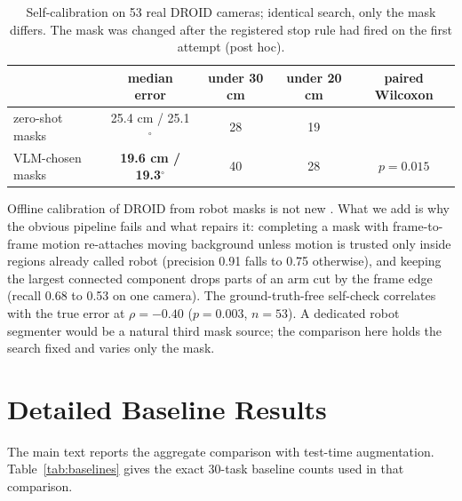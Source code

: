 \documentclass{article}
\begin{document}
\begin{table}[h]
\centering\small
\caption{Self-calibration on 53 real DROID cameras; identical search, only the mask differs. The mask was changed after
the registered stop rule had fired on the first attempt (post hoc).}
\label{tab:droid}
\begin{tabular}{lcccc}
\toprule
& median error & under 30 cm & under 20 cm & paired Wilcoxon \\
\midrule
zero-shot masks & 25.4 cm / 25.1$^\circ$ & 28 & 19 & \\
VLM-chosen masks & \textbf{19.6 cm / 19.3$^\circ$} & 40 & 28 & $p=0.015$ \\
\bottomrule
\end{tabular}
\end{table}
Offline calibration of DROID from robot masks is not new \citep{caliball,poseddroid}. What we add is why the obvious
pipeline fails and what repairs it: completing a mask with frame-to-frame motion re-attaches moving background unless
motion is trusted only inside regions already called robot (precision 0.91 falls to 0.75 otherwise), and keeping the
largest connected component drops parts of an arm cut by the frame edge (recall 0.68 to 0.53 on one camera). The
ground-truth-free self-check correlates with the true error at $\rho=-0.40$ ($p=0.003$, $n=53$). A dedicated robot
segmenter \citep{robotseg} would be a natural third mask source; the comparison here holds the search fixed and varies
only the mask.

\section{Detailed Baseline Results}

\label{app:baselines}

The main text reports the aggregate comparison with test-time augmentation. Table~\ref{tab:baselines} gives the exact
30-task baseline counts used in that comparison.

\begin{table}[t]
\centering\small
\caption{Exact baseline results on 30 OFT \texttt{libero\_10} camera tasks.}
\label{tab:baselines}
\end{table}
\end{document}
